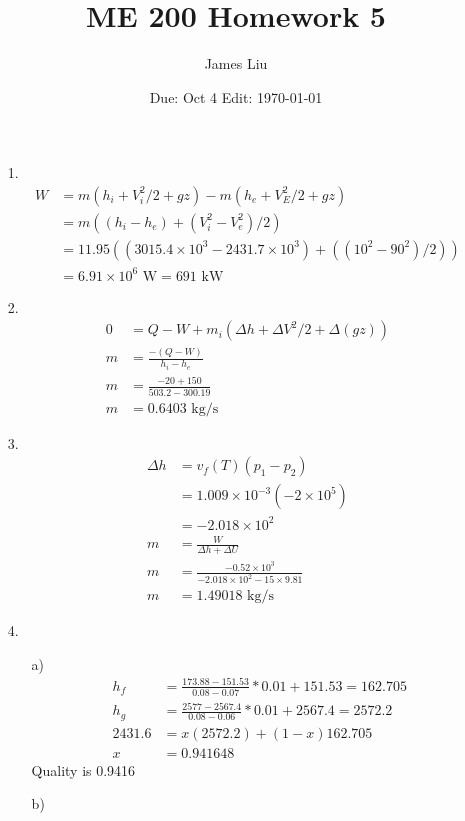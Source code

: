 \documentclass{article}
\date{Due: Oct 4  Edit: \today}
\title{ME 200 Homework 5}
\author{James Liu}
\begin{document}
\maketitle
\begin{itemize}
    \item [1.] 
    \begin{align*}
        W &= m(h_i+V_i^2/2+gz)-m(h_e+V_E^2/2+gz)\\
        &=m((h_i-h_e)+(V_i^2-V_e^2)/2)\\
        &=11.95((3015.4\times 10^3-2431.7\times 10^3)+((10^2-90^2)/2))\\
        &=6.91\times 10^6\text{ W} = 691 \text{ kW}    
    \end{align*}
    \item [2.]
    \begin{align*}
        0 &= Q-W+m_i(\Delta h + \Delta V^2/2+\Delta(gz))\\
        m &=\frac{-(Q-W)}{h_i-h_e}\\
        m &=\frac{-20+150}{503.2-300.19}\\
        m &=0.6403 \text{ kg/s}
    \end{align*}
    \item [3.]
    \begin{align*}
            \Delta h &= v_f (T )( p_1-p_2)\\
            &=1.009\times 10^{-3} (-2\times 10^5)\\
            &=-2.018\times 10^2\\
            m&=\frac{W}{\Delta h + \Delta U}\\
            m&=\frac{-0.52\times 10^3}{-2.018\times 10^2-15\times9.81}\\
            m&=1.49018 \text{ kg/s}
    \end{align*}
    \item [4.]
    \begin{itemize}
        \item [a)]
        \begin{align*}
            h_f &= \frac{173.88-151.53}{0.08-0.07}*0.01+151.53 =162.705\\
            h_g &= \frac{2577-2567.4}{0.08-0.06}*0.01+2567.4=2572.2\\
            2431.6 &= x(2572.2)+(1-x)162.705\\
            x &=0.941648
        \end{align*}
        Quality is 0.9416
        \item [b)]
        \begin{align*}

\end{align*}
\end{itemize}
\end{itemize}
\end{document}
